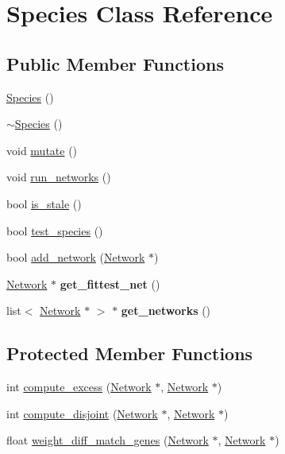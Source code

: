 \hypertarget{classSpecies}{}\section{Species Class Reference}
\label{classSpecies}
\subsection*{Public Member Functions}
\begin{DoxyCompactItemize}
\item 
\hyperlink{classSpecies_abb0f8e3208b0cc676157b7dff837c0be}{Species} ()
\item 
\hyperlink{classSpecies_af36f93648e2dedc2f05b6fb0c067f35e}{$\sim$\+Species} ()
\item 
void \hyperlink{classSpecies_ab4c037683307c828083dde00cd7e673d}{mutate} ()
\item 
void \hyperlink{classSpecies_ae79d188cf5cb0ef1d6b82e44632ebf94}{run\+\_\+networks} ()
\item 
bool \hyperlink{classSpecies_a716e5737f0367dc4f908bab1e47cf5ac}{is\+\_\+stale} ()
\item 
bool \hyperlink{classSpecies_ad8a5df4740c1a7ac43d2f4d6e47a8092}{test\+\_\+species} ()
\item 
bool \hyperlink{classSpecies_affa8963fa8100c32641ce74d3db74727}{add\+\_\+network} (\hyperlink{classNetwork}{Network} $\ast$)
\item 
\hyperlink{classNetwork}{Network} $\ast$ {\bfseries get\+\_\+fittest\+\_\+net} ()\hypertarget{classSpecies_a6803c4d940e7c446c7d460881c396476}{}\label{classSpecies_a6803c4d940e7c446c7d460881c396476}

\item 
list$<$ \hyperlink{classNetwork}{Network} $\ast$ $>$ $\ast$ {\bfseries get\+\_\+networks} ()\hypertarget{classSpecies_a77b60e856161f623e3dd7808739bd7b6}{}\label{classSpecies_a77b60e856161f623e3dd7808739bd7b6}

\end{DoxyCompactItemize}
\subsection*{Protected Member Functions}
\begin{DoxyCompactItemize}
\item 
int \hyperlink{classSpecies_ae2d126bd948f511a31f20322cd2a0c37}{compute\+\_\+excess} (\hyperlink{classNetwork}{Network} $\ast$, \hyperlink{classNetwork}{Network} $\ast$)
\item 
int \hyperlink{classSpecies_a942e1e1958fb5251ef0786ce6199a17f}{compute\+\_\+disjoint} (\hyperlink{classNetwork}{Network} $\ast$, \hyperlink{classNetwork}{Network} $\ast$)
\item 
float \hyperlink{classSpecies_a732289d5916f65785694da76a26ff957}{weight\+\_\+diff\+\_\+match\+\_\+genes} (\hyperlink{classNetwork}{Network} $\ast$, \hyperlink{classNetwork}{Network} $\ast$)
\end{DoxyCompactItemize}


